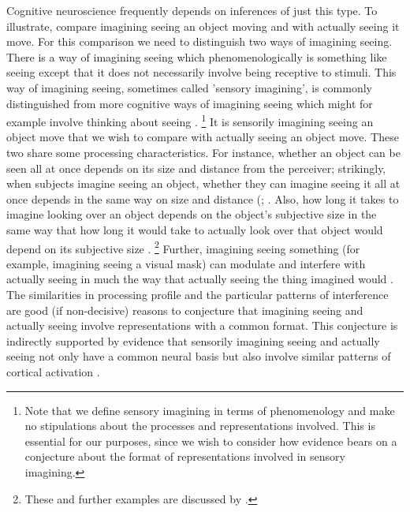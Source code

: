 \documentclass[12pt,\papersize]{extarticle}
\begin{document}
Cognitive neuroscience frequently depends on inferences of just this type. To illustrate, compare imagining seeing an object moving and with actually seeing it move. For this comparison we need to distinguish two ways of imagining seeing. There is a way of imagining seeing which phenomenologically is something like seeing except that it does not necessarily involve being receptive to stimuli. This way of imagining seeing, sometimes called 'sensory imagining', is commonly distinguished from more cognitive ways of imagining seeing which might for example involve thinking about seeing \citep[§2.1]{Gendler:2011_imagination}.%
\footnote{Note that we define sensory imagining in terms of phenomenology and make no stipulations about the processes and representations involved.  This is essential for our purposes, since we wish to consider how evidence bears on a conjecture about the format of representations involved in sensory imagining.}
It is sensorily imagining seeing an object move that we wish to compare with actually seeing an object move.  These two share some processing characteristics.  For instance, whether an object can be seen all at once depends on its size and distance from the perceiver; strikingly, when subjects imagine seeing an object, whether they can imagine seeing it all at once depends in the same way on size and distance (\citealp{kosslyn:1978_measuring}; \citealp[p.\ 99ff]{kosslyn:1994_image}.  Also, how long it takes to imagine looking over an object depends on the object's subjective size in the same way that how long it would take to actually look over that object would depend on its subjective size \citep{kosslyn:1978_visual}.%
\footnote{These and further examples are discussed by \citet[p.\ 165]{currie:1997_mental}.} Further, imagining seeing something (for example, imagining seeing a visual mask) can modulate and interfere with actually seeing in much the way that actually seeing the thing imagined would \citep{pearson:2008_functional,ishai:1995_common}. The similarities in processing profile and the particular patterns of interference are good (if non-decisive) reasons to conjecture that imagining seeing and actually seeing involve representations with a common format.  This conjecture is indirectly supported by evidence that sensorily imagining seeing and actually seeing not only have a common neural basis but also involve similar patterns of cortical activation \citep[e.g.][]{page:2011_erp}. 
\end{document}
